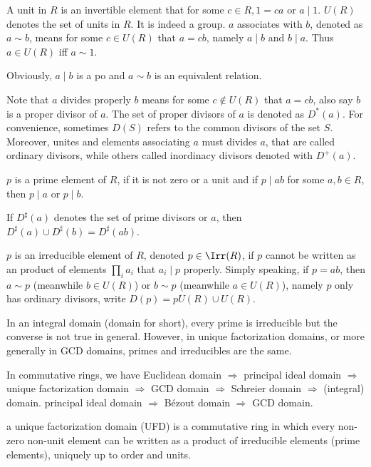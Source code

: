 \documentclass[11pt,a4paper,fleqn]{article}
\begin{document}
\begin{definition} A unit in $R$ is an invertible element that for some $c\in R,1=ca$ or $a\mid 1$. $U(R)$ denotes the set of units in $R$. It is indeed a group. $a$ associates with $b$, denoted as $a\sim b$, means for some $c\in U(R)$ that $a=cb$, namely $a\mid b$ and $b\mid a$. Thus $a\in U(R)$ iff $a\sim 1$.
\end{definition}

Obviously, $a\mid b$ is a po and $a\sim b$ is an equivalent relation.

Note that $a$ divides properly $b$ means for some $c\not\in U(R)$ that $a=cb$, also say $b$ is a proper divisor of $a$. The set of proper divisors of $a$ is denoted as $D^*(a)$. For convenience, sometimes $D(S)$ refers to the common divisors of the set $S$. Moreover, unites and elements associating $a$ must divides $a$, that are called ordinary divisors, while others called inordinacy divisors denoted with $D^+(a)$.

\begin{definition} $p$ is a prime element of $R$, if it is not zero or a unit and if $p\mid ab$ for some $a,b\in R$, then $p\mid a$ or $p\mid b$.
\end{definition}
If $D^\sharp(a)$ denotes the set of prime divisors or $a$, then $D^\sharp(a)\cup D^\sharp(b)=D^\sharp(ab)$.

\begin{definition} $p$ is an irreducible element of $R$, denoted $p\in\Irr(R)$, if $p$ cannot be written as an product of elements $\prod_ia_i$ that $a_i\mid p$ properly. Simply speaking, if $p=ab$, then $a\sim p$ (meanwhile $b\in U(R)$) or $b\sim p$ (meanwhile $a\in U(R)$), namely $p$ only has ordinary divisors, write $D(p)=pU(R)\cup U(R)$.
\end{definition}

In an integral domain (domain for short), every prime is irreducible but the converse is not true in general. However, in unique factorization domains, or more generally in GCD domains, primes and irreducibles are the same.

In commutative rings, we have
Euclidean domain $\Rightarrow$ principal ideal domain $\Rightarrow$ unique factorization domain $\Rightarrow$ GCD domain $\Rightarrow$ Schreier domain $\Rightarrow$ (integral) domain. principal ideal domain $\Rightarrow$ B\'{e}zout domain $\Rightarrow$ GCD domain.

\begin{definition}
 a unique factorization domain (UFD) is a commutative ring in which every non-zero non-unit element can be written as a product of irreducible elements (prime elements), uniquely up to order and units.
 \end{definition}
\end{document}
